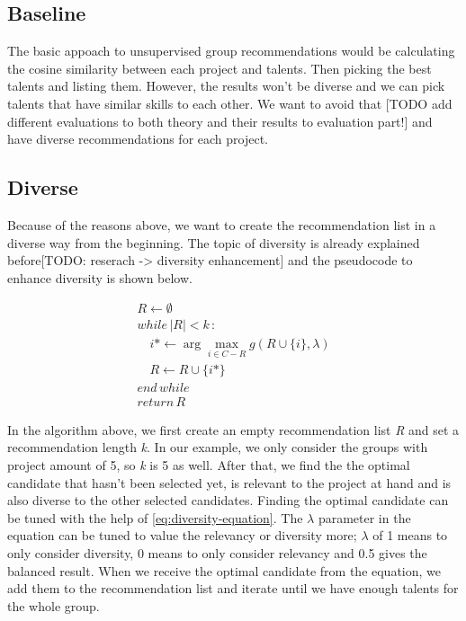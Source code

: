 \subsection{Baseline}

The basic appoach to unsupervised group recommendations would be calculating the cosine similarity between each project and talents. Then picking the best talents and listing them. However, the results won't be diverse and we can pick talents that have similar skills to each other. We want to avoid that [TODO add different evaluations to both theory and their results to evaluation part!] and have diverse recommendations for each project.

\subsection{Diverse}

Because of the reasons above, we want to create the recommendation list in a diverse way from the beginning. The topic of diversity is already explained before[TODO: reserach -> diversity enhancement] and the pseudocode to enhance diversity is shown below.

\begin{equation}
\begin{array} { l } { R \leftarrow \emptyset } \\ {  while\, | R | < k\,: } \\ { \quad i * \leftarrow \arg \max _ { i \in C - R } g ( R \cup \{ i \} , \lambda ) } \\ { \quad R \leftarrow R \cup \{ i * \} } \\ { end\, while\,  } \\ {  return\,  R } \end{array}
\label{eq:diversity-enhancement}
\end{equation}


In the algorithm above, we first create an empty recommendation list \textit{R} and set a recommendation length \textit{k}. In our example, we only consider the groups with project amount of 5, so \textit{k} is 5 as well. After that, we find the the optimal candidate that hasn't been selected yet, is relevant to the project at hand and is also diverse to the other selected candidates. Finding the optimal candidate can be tuned with the help of \autoref{eq:diversity-equation}. The $\lambda$ parameter in the equation can be tuned to value the relevancy or diversity more; $\lambda$ of 1 means to only consider diversity, 0 means to only consider relevancy and 0.5 gives the balanced result. When we receive the optimal candidate from the equation, we add them to the recommendation list and iterate until we have enough talents for the whole group.

